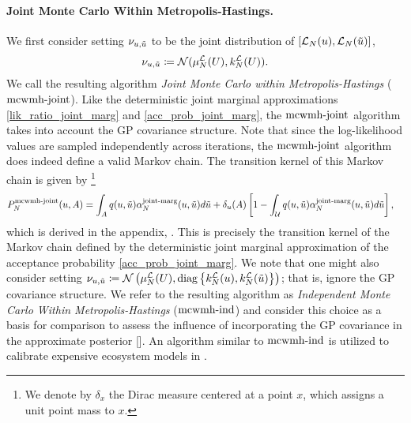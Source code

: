 \documentclass[12pt]{article}
\begin{document}
\paragraph{Joint Monte Carlo Within Metropolis-Hastings.}
We first consider setting $\llikSampDist_{\Par, \propPar}$ to be the joint distribution of 
$[\llikEm[\Ndesign](\Par), \llikEm[\Ndesign](\propPar)]$, 
\begin{align}
\llikSampDist_{\Par, \propPar} \Def \Gaussian(\emMean[\Ndesign]{\llik}(\parMat), \emKer[\Ndesign]{\llik}(\parMat)).
\label{llik_dist_MCWMH-joint}
\end{align}
We call the resulting algorithm \textit{Joint Monte Carlo within Metropolis-Hastings} ($\mcwmhJointLabel$). 
Like the deterministic joint marginal approximations \ref{lik_ratio_joint_marg} and \ref{acc_prob_joint_marg}, 
the $\mcwmhJointLabel$ algorithm takes into account the GP covariance structure. Note that since the log-likelihood
values are sampled independently across iterations, the $\mcwmhJointLabel$ algorithm does indeed define a valid 
Markov chain. The transition kernel of this Markov chain is given by 
\footnote{We denote by $\delta_{x}$ the Dirac measure centered at a point $x$, which assigns a unit point mass to $x$.}
\begin{align}
\llikEmJointMCWMH[\Ndesign]{\MarkovKernel}(\Par, A) 
&= \int_{A} \propDens(\Par, \propPar) \llikEmJointMarg[\Ndesign]{\accProbMH}(\Par, \propPar) d\propPar 
+ \delta_{\Par}(A) \left[1 - \int_{\parSpace} \propDens(\Par, \propPar) \llikEmJointMarg[\Ndesign]{\accProbMH}(\Par, \propPar) d\propPar \right],
\label{MCWMH-joint-kernel}
\end{align}
which is derived in the appendix, . This is precisely the transition kernel of the Markov chain 
defined by the deterministic joint marginal approximation of the acceptance probability \ref{acc_prob_joint_marg}. We note that 
one might also consider setting 
$\llikSampDist_{\Par, \propPar} 
\Def \Gaussian\left(\emMean[\Ndesign]{\llik}(\parMat), \diag\left\{\emKer[\Ndesign]{\llik}(\Par), \emKer[\Ndesign]{\llik}(\propPar) \right\}\right)$; 
that is, ignore the GP covariance structure. We refer to the resulting algorithm as
\textit{Independent Monte Carlo Within Metropolis-Hastings} ($\mcwmhIndLabel$) and consider this choice as a basis for 
comparison to assess the influence of incorporating the GP covariance in the approximate posterior [\todo]. 
An algorithm similar to $\mcwmhIndLabel$ is utilized to calibrate expensive ecosystem models 
in \cite{FerEmulation}. 
\end{document}
